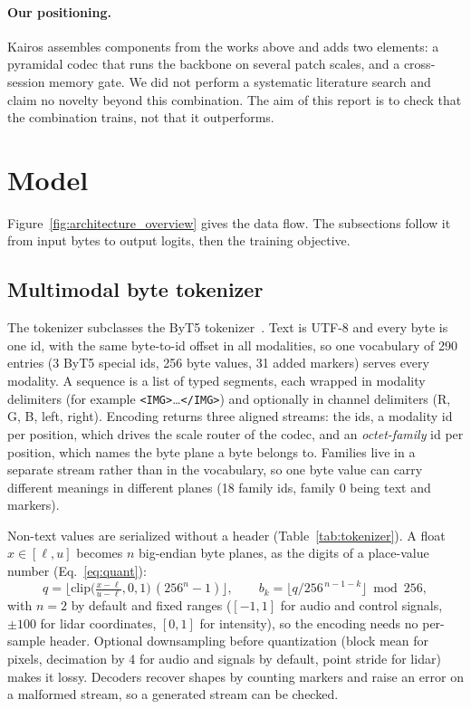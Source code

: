 \documentclass[11pt]{article}
\begin{document}
\paragraph{Our positioning.} Kairos assembles components from the works above and adds
two elements: a pyramidal codec that runs the backbone on several patch scales, and a
cross-session memory gate. We did not perform a systematic literature search and claim no novelty beyond this combination. The aim of this report is to check that the
combination trains, not that it outperforms.

\section{Model}

Figure~\ref{fig:architecture_overview} gives the data flow. The subsections follow it from
input bytes to output logits, then the training objective.

\subsection{Multimodal byte tokenizer}
\label{sec:tokenizer}

The tokenizer subclasses the ByT5 tokenizer~\citep{xue2022byt5}. Text is UTF-8 and every byte is
one id, with the same byte-to-id offset in all modalities, so one vocabulary of 290 entries (3 ByT5
special ids, 256 byte values, 31 added markers) serves every modality. A sequence is a list of
typed segments, each wrapped in modality delimiters (for example \texttt{<IMG>}\ldots\texttt{</IMG>})
and optionally in channel delimiters (R, G, B, left, right). Encoding returns three aligned
streams: the ids, a modality id per position, which drives the scale router of the codec, and an
\emph{octet-family} id per position, which names the byte plane a byte belongs to. Families live
in a separate stream rather than in the vocabulary, so one byte value can carry different meanings
in different planes (18 family ids, family 0 being text and markers).

Non-text values are serialized without a header (Table~\ref{tab:tokenizer}). A float
$x\in[\ell,u]$ becomes $n$ big-endian byte planes, as the digits of a place-value number (Eq.~\ref{eq:quant}):
\begin{equation}
q=\Big\lfloor \text{clip}\Big(\tfrac{x-\ell}{u-\ell},0,1\Big)\,(256^{n}-1)\Big\rfloor,\qquad
b_k=\Big\lfloor q/256^{\,n-1-k}\Big\rfloor \bmod 256,
\label{eq:quant}
\end{equation}
with $n=2$ by default and fixed ranges ($[-1,1]$ for audio and control signals, $\pm100$ for lidar
coordinates, $[0,1]$ for intensity), so the encoding needs no per-sample header. Optional
downsampling before quantization (block mean for pixels, decimation by 4 for audio and signals by
default, point stride for lidar) makes it lossy. Decoders recover shapes by counting markers and
raise an error on a malformed stream, so a generated stream can be checked.
\end{document}
